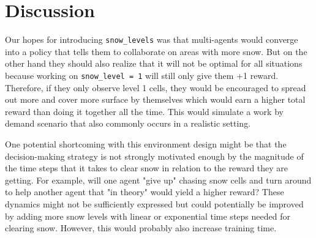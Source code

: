 \documentclass{scrartcl}
\theoremstyle{mytheoremstyle}
\theoremstyle{mytheoremstyle}
\theoremstyle{myproblemstyle}
\begin{document}
\section{Discussion}

Our hopes for introducing \verb|snow_levels| was that multi-agents would converge into a policy that tells them to collaborate on areas with more snow. But on the other hand they should also realize that it will not be optimal for all situations because working on \verb|snow_level = 1| will still only give them +1 reward. Therefore, if they only observe level 1 cells, they would be encouraged to spread out more and cover more surface by themselves which would earn a higher total reward than doing it together all the time. This would simulate a work by demand  scenario that also commonly occurs in a realistic setting.

One potential shortcoming with this environment design might be that the decision-making strategy is not strongly motivated enough by the magnitude of the time steps that it takes to clear snow in relation to the reward they are getting. For example, will one agent "give up" chasing snow cells and turn around to help another agent that "in theory" would yield a higher reward? These dynamics might not be sufficiently expressed but could potentially be improved by adding more snow levels with linear or exponential time steps needed for clearing snow. However, this would probably also increase training time.







\end{document}
